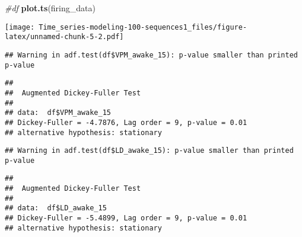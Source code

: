\documentclass[
]{article}
\newenvironment{Shaded}{\begin{snugshade}}{\end{snugshade}}
\newcommand{\CommentTok}[1]{\textcolor[rgb]{0.56,0.35,0.01}{\textit{#1}}}
\newcommand{\FunctionTok}[1]{\textcolor[rgb]{0.13,0.29,0.53}{\textbf{#1}}}
\newcommand{\NormalTok}[1]{#1}
\newcommand{\SpecialCharTok}[1]{\textcolor[rgb]{0.81,0.36,0.00}{\textbf{#1}}}
\begin{document}
\begin{Shaded}
\begin{Highlighting}[]
\CommentTok{\#df}
\FunctionTok{plot.ts}\NormalTok{(firing\_data)}
\end{Highlighting}
\end{Shaded}

\texttt{[image: Time\_series-modeling-100-sequences1\_files/figure-latex/unnamed-chunk-5-2.pdf]}

\begin{Shaded}
\end{Shaded}

\begin{verbatim}
## Warning in adf.test(df$VPM_awake_15): p-value smaller than printed p-value
\end{verbatim}

\begin{verbatim}
## 
##  Augmented Dickey-Fuller Test
## 
## data:  df$VPM_awake_15
## Dickey-Fuller = -4.7876, Lag order = 9, p-value = 0.01
## alternative hypothesis: stationary
\end{verbatim}

\begin{Shaded}
\end{Shaded}

\begin{verbatim}
## Warning in adf.test(df$LD_awake_15): p-value smaller than printed p-value
\end{verbatim}

\begin{verbatim}
## 
##  Augmented Dickey-Fuller Test
## 
## data:  df$LD_awake_15
## Dickey-Fuller = -5.4899, Lag order = 9, p-value = 0.01
## alternative hypothesis: stationary
\end{verbatim}

\begin{Shaded}
\end{Shaded}
\end{document}
